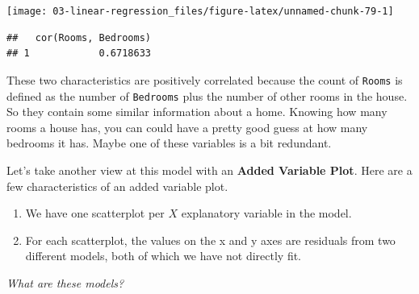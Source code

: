 \documentclass[
]{book}
\newenvironment{Shaded}{\begin{snugshade}}{\end{snugshade}}
\newcommand{\DataTypeTok}[1]{\textcolor[rgb]{0.13,0.29,0.53}{#1}}
\newcommand{\KeywordTok}[1]{\textcolor[rgb]{0.13,0.29,0.53}{\textbf{#1}}}
\newcommand{\NormalTok}[1]{#1}
\newcommand{\OperatorTok}[1]{\textcolor[rgb]{0.81,0.36,0.00}{\textbf{#1}}}
\newcommand{\StringTok}[1]{\textcolor[rgb]{0.31,0.60,0.02}{#1}}
\providecommand{\tightlist}{%
  \setlength{\itemsep}{0pt}\setlength{\parskip}{0pt}}
\begin{document}
\begin{Shaded}
\end{Shaded}

\begin{center}\texttt{[image: 03-linear-regression\_files/figure-latex/unnamed-chunk-79-1]} \end{center}

\begin{Shaded}
\end{Shaded}

\begin{verbatim}
##   cor(Rooms, Bedrooms)
## 1            0.6718633
\end{verbatim}

These two characteristics are positively correlated because the count of \texttt{Rooms} is defined as the number of \texttt{Bedrooms} plus the number of other rooms in the house. So they contain some similar information about a home. Knowing how many rooms a house has, you can could have a pretty good guess at how many bedrooms it has. Maybe one of these variables is a bit redundant.

Let's take another view at this model with an \textbf{Added Variable Plot}. Here are a few characteristics of an added variable plot.

\begin{enumerate}
\def\labelenumi{\arabic{enumi}.}
\tightlist
\item
  We have one scatterplot per \(X\) explanatory variable in the model.
\item
  For each scatterplot, the values on the x and y axes are residuals from two different models, both of which we have not directly fit.
\end{enumerate}

\emph{What are these models?}
\end{document}
